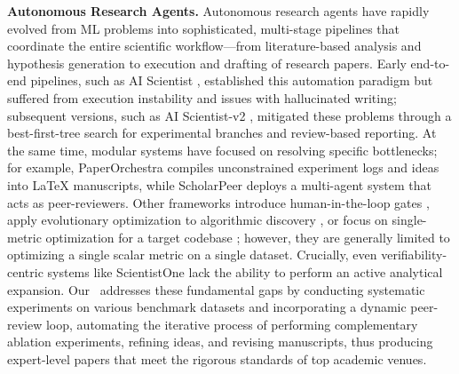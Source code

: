 \noindent\textbf{Autonomous Research Agents.} Autonomous research agents have rapidly evolved from ML problems into sophisticated, multi-stage pipelines that coordinate the entire scientific workflow—from literature-based analysis and hypothesis generation to execution and drafting of research papers. Early end-to-end pipelines, such as AI Scientist \citep{lu2024ai}, established this automation paradigm but suffered from execution instability and issues with hallucinated writing; subsequent versions, such as AI Scientist-v2 \citep{yamada2025ai}, mitigated these problems through a best-first-tree search for experimental branches and review-based reporting. At the same time, modular systems have focused on resolving specific bottlenecks; for example, PaperOrchestra \citep{song2026paperorchestra} compiles unconstrained experiment logs and ideas into LaTeX manuscripts, while ScholarPeer \citep{goyal2026scholarpeer} deploys a multi-agent system that acts as peer-reviewers. Other frameworks introduce human-in-the-loop gates \citep{schmidgall2025agent}, apply evolutionary optimization to algorithmic discovery \citep{novikov2025alphaevolve, lyu2026evoscientist}, or focus on single-metric optimization for a target codebase \citep{li2026autosota, liu2026autoresearchclaw, tang2026ai, weng2025deepscientist}; however, they are generally limited to optimizing a single scalar metric on a single dataset. Crucially, even verifiability-centric systems like ScientistOne \citep{meng2026scientistone} lack the ability to perform an active analytical expansion. Our \sname~addresses these fundamental gaps by conducting systematic experiments on various benchmark datasets and incorporating a dynamic peer-review loop, automating the iterative process of performing complementary ablation experiments, refining ideas, and revising manuscripts, thus producing expert-level papers that meet the rigorous standards of top academic venues.